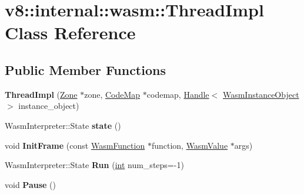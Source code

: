 \hypertarget{classv8_1_1internal_1_1wasm_1_1ThreadImpl}{}\section{v8\+:\+:internal\+:\+:wasm\+:\+:Thread\+Impl Class Reference}
\label{classv8_1_1internal_1_1wasm_1_1ThreadImpl}
\subsection*{Public Member Functions}
\begin{DoxyCompactItemize}
\item 
\mbox{\label{classv8_1_1internal_1_1wasm_1_1ThreadImpl_acb2e7261a3e1ed806c43f940fb02d6f1}} 
{\bfseries Thread\+Impl} (\mbox{\hyperlink{classv8_1_1internal_1_1Zone}{Zone}} $\ast$zone, \mbox{\hyperlink{classv8_1_1internal_1_1wasm_1_1CodeMap}{Code\+Map}} $\ast$codemap, \mbox{\hyperlink{classv8_1_1internal_1_1Handle}{Handle}}$<$ \mbox{\hyperlink{classv8_1_1internal_1_1WasmInstanceObject}{Wasm\+Instance\+Object}} $>$ instance\+\_\+object)
\item 
\mbox{\label{classv8_1_1internal_1_1wasm_1_1ThreadImpl_a9d497458de88260b17e3c6ed94bb383d}} 
Wasm\+Interpreter\+::\+State {\bfseries state} ()
\item 
\mbox{\label{classv8_1_1internal_1_1wasm_1_1ThreadImpl_adcce9440eafe228928c2ebdaf52b5814}} 
void {\bfseries Init\+Frame} (const \mbox{\hyperlink{structv8_1_1internal_1_1wasm_1_1WasmFunction}{Wasm\+Function}} $\ast$function, \mbox{\hyperlink{classv8_1_1internal_1_1wasm_1_1WasmValue}{Wasm\+Value}} $\ast$args)
\item 
\mbox{\label{classv8_1_1internal_1_1wasm_1_1ThreadImpl_a88010741d8b1ef6633ed4afdda081a97}} 
Wasm\+Interpreter\+::\+State {\bfseries Run} (\mbox{\hyperlink{classint}{int}} num\+\_\+steps=-\/1)
\item 
\mbox{\label{classv8_1_1internal_1_1wasm_1_1ThreadImpl_ac39aa6dc925aa9e25d0103b0b544147f}} 
void {\bfseries Pause} ()
\item 

\end{DoxyCompactItemize}
